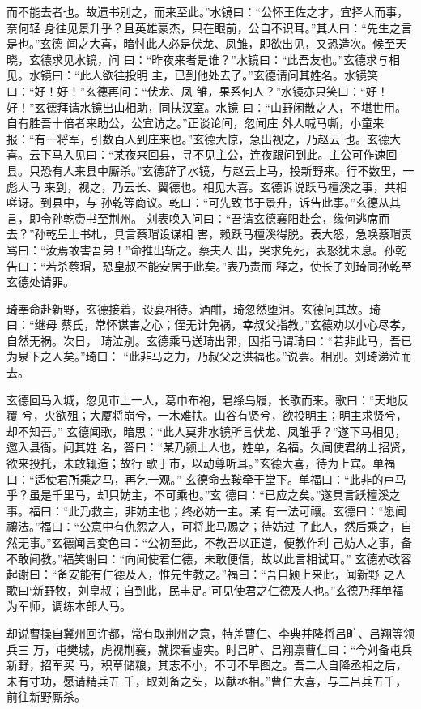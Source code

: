 而不能去者也。故遗书别之，而来至此。”水镜曰：“公怀王佐之才，宜择人而事，奈何轻
身往见景升乎？且英雄豪杰，只在眼前，公自不识耳。”其人曰：“先生之言是也。”玄德
闻之大喜，暗忖此人必是伏龙、凤雏，即欲出见，又恐造次。候至天晓，玄德求见水镜，问
曰：“昨夜来者是谁？”水镜曰：“此吾友也。”玄德求与相见。水镜曰：“此人欲往投明
主，已到他处去了。”玄德请问其姓名。水镜笑曰：“好！好！”玄德再问：“伏龙、凤
雏，果系何人？”水镜亦只笑曰：“好！好！”玄德拜请水镜出山相助，同扶汉室。水镜
曰：“山野闲散之人，不堪世用。自有胜吾十倍者来助公，公宜访之。”正谈论间，忽闻庄
外人喊马嘶，小童来报：“有一将军，引数百人到庄来也。”玄德大惊，急出视之，乃赵云
也。玄德大喜。云下马入见曰：“某夜来回县，寻不见主公，连夜跟问到此。主公可作速回
县。只恐有人来县中厮杀。”玄德辞了水镜，与赵云上马，投新野来。行不数里，一彪人马
来到，视之，乃云长、翼德也。相见大喜。玄德诉说跃马檀溪之事，共相嗟讶。到县中，与
孙乾等商议。乾曰：“可先致书于景升，诉告此事。”玄德从其言，即令孙乾赍书至荆州。
刘表唤入问曰：“吾请玄德襄阳赴会，缘何逃席而去？”孙乾呈上书札，具言蔡瑁设谋相
害，赖跃马檀溪得脱。表大怒，急唤蔡瑁责骂曰：“汝焉敢害吾弟！”命推出斩之。蔡夫人
出，哭求免死，表怒犹未息。孙乾告曰：“若杀蔡瑁，恐皇叔不能安居于此矣。”表乃责而
释之，使长子刘琦同孙乾至玄德处请罪。

琦奉命赴新野，玄德接着，设宴相待。酒酣，琦忽然堕泪。玄德问其故。琦曰：“继母
蔡氏，常怀谋害之心；侄无计免祸，幸叔父指教。”玄德劝以小心尽孝，自然无祸。次日，
琦泣别。玄德乘马送琦出郭，因指马谓琦曰：“若非此马，吾已为泉下之人矣。”琦曰：
“此非马之力，乃叔父之洪福也。”说罢。相别。刘琦涕泣而去。

玄德回马入城，忽见市上一人，葛巾布袍，皂绦乌履，长歌而来。歌曰：“天地反覆
兮，火欲殂；大厦将崩兮，一木难扶。山谷有贤兮，欲投明主；明主求贤兮，却不知吾。”
玄德闻歌，暗思：“此人莫非水镜所言伏龙、凤雏乎？”遂下马相见，邀入县衙。问其姓
名，答曰：“某乃颍上人也，姓单，名福。久闻使君纳士招贤，欲来投托，未敢辄造；故行
歌于市，以动尊听耳。”玄德大喜，待为上宾。单福曰：“适使君所乘之马，再乞一观。”
玄德命去鞍牵于堂下。单福曰：“此非的卢马乎？虽是千里马，却只妨主，不可乘也。”玄
德曰：“已应之矣。”遂具言跃檀溪之事。福曰：“此乃救主，非妨主也；终必妨一主。某
有一法可禳。玄德曰：“愿闻禳法。”福曰：“公意中有仇怨之人，可将此马赐之；待妨过
了此人，然后乘之，自然无事。”玄德闻言变色曰：“公初至此，不教吾以正道，便教作利
己妨人之事，备不敢闻教。”福笑谢曰：“向闻使君仁德，未敢便信，故以此言相试耳。”
玄德亦改容起谢曰：“备安能有仁德及人，惟先生教之。”福曰：“吾自颍上来此，闻新野
之人歌曰‘新野牧，刘皇叔；自到此，民丰足。’可见使君之仁德及人也。”玄德乃拜单福
为军师，调练本部人马。

却说曹操自冀州回许都，常有取荆州之意，特差曹仁、李典并降将吕旷、吕翔等领兵三
万，屯樊城，虎视荆襄，就探看虚实。时吕旷、吕翔禀曹仁曰：“今刘备屯兵新野，招军买
马，积草储粮，其志不小，不可不早图之。吾二人自降丞相之后，未有寸功，愿请精兵五
千，取刘备之头，以献丞相。”曹仁大喜，与二吕兵五千，前往新野厮杀。


